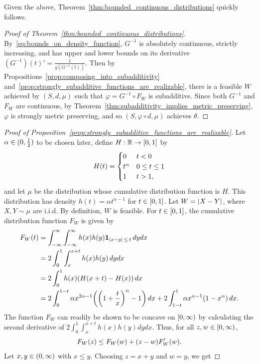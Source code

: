 \documentclass[AHL,Unicode]{cedram}
\renewcommand*\r{\mathbb{R}}
\newcommand*\one{\mathbf{1}}
\newcommand*\nonnegative{\left[0,\infty\right)}
\newcommand*\abs[1]{\left|#1\right|}
\let\originalleft\left
\let\originalright\right
\renewcommand{\left}{\mathopen{}\mathclose\bgroup\originalleft}
\renewcommand{\right}{\aftergroup\egroup\originalright}
\renewcommand*{\to}{\mathchoice{\longrightarrow}{\rightarrow}{\rightarrow}{\rightarrow}}
\let\oldin\in
\renewcommand{\in}{\mathchoice{\oldin}{\oldin}{\,\oldin\,}{\,\oldin\,}}
\begin{document}
Given the above, Theorem~\ref{thm:bounded_continuous_distributions} quickly follows.
\begin{proof}[Proof of Theorem~\ref{thm:bounded_continuous_distributions}]
By~\eqref{eq:bounds_on_density_function}, $G^{-1}$ is absolutely continuous, strictly increasing, and has upper and lower bounds on its derivative $(G^{-1})(t)'=\frac{1}{g(G^{-1}(t))}$. Then by Propositions~\ref{prop:composing_into_subadditivity} and~\ref{prop:strongly_subadditive_functions_are_realizable}, there is a feasible $W$ achieved by $(S,d,\mu)$ such that $\varphi=G^{-1}\circ F_{W}$ is subadditive. Since both $G^{-1}$ and $F_{W}$ are continuous, by Theorem~\ref{thm:subadditivity_implies_metric_preserving}, $\varphi$ is strongly metric preserving, and so $(S,\varphi\circ d,\mu)$ achieves $\theta$.
\end{proof}
\begin{proof}[Proof of Proposition~\ref{prop:strongly_subadditive_functions_are_realizable}]
Let $\alpha\in(0,\frac{1}{2})$ to be chosen later, define $H:\r\to[0,1]$ by
\[
H\left(t\right)=
\begin{cases}
0 & t<0\\
t^{\alpha} & 0\leq t\leq1\\
1 & t>1,
\end{cases}
\]
and let $\mu$ be the distribution whose cumulative distribution function is $H$. This distribution has density $h(t)=\alpha t^{\alpha-1}$ for $t\in[0,1]$. Let $W=\abs{X-Y}$, where $X,Y\sim\mu$ are i.i.d. By definition, $W$ is feasible. For $t\in[0,1]$, the cumulative distribution function $F_{W}$ is given by
\begin{align*}
F_{W}\left(t\right) & =\int_{-\infty}^{\infty}\int_{-\infty}^{\infty}h\left(x\right)h\left(y\right)\one_{\abs{x-y}\,\leq\,t}\,dydx\\
& =2\int_{0}^{1}\int_{x}^{x+t}h\left(x\right)h\left(y\right)\,dydx\\
& =2\int_{0}^{1}h\left(x\right)\left(H\left(x+t\right)-H\left(x\right)\right)\,dx\\
& =2\int_{0}^{1-t}\alpha x^{2\alpha-1}\left(\left(1+\frac{t}{x}\right)^{\alpha}-1\right)\,dx+2\int_{1-t}^{1}\alpha x^{\alpha-1}\left(1-x^{\alpha}\right)\,dx.
\end{align*}
The function $F_{W}$ can readily be shown to be concave on $\nonnegative$ by calculating the second derivative of $2\int_{0}^{1}\int_{x}^{x+t}h(x)h(y)dydx$. Thus, for all $z,w\in\nonnegative$,
\[
F_{W}\left(z\right)\leq F_{W}\left(w\right)+\left(z-w\right)F_{W}'\left(w\right).
\]
Let $x,y\in(0,\infty)$ with $x\leq y$. Choosing $z=x+y$ and $w=y$, we get

\end{proof}
\end{document}
